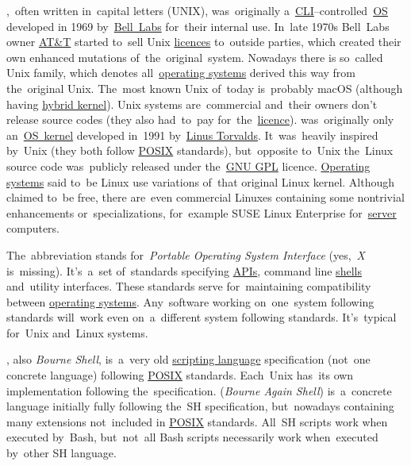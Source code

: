 \label{linux}

\label{unixlinux}
\begin{itemize}
    ,~often written in~capital letters (UNIX), was~originally a~\hyperref[shellcligui]{CLI}--controlled~\hyperref[os]{OS} developed in 1969 by~\href{https://en.wikipedia.org/wiki/Bell_Labs}{Bell~Labs} for~their internal use.
            In~late 1970s Bell~Labs owner \href{https://en.wikipedia.org/wiki/AT\%26T}{AT\&T} started to~sell Unix \hyperref[licencing]{licences} to~outside parties, which created their own enhanced mutations of~the~original~system.
            Nowadays there is so~called Unix family, which denotes all~\hyperref[os]{operating systems} derived this way from the~original Unix.
            The~most known Unix of~today is~probably macOS (although having \hyperref[hybridkernel]{hybrid kernel}).
            \warningnonl Unix systems are~commercial and~their owners don't release source codes (they also had~to~pay for~the~\hyperref[licencing]{licence}).
     was~originally only an~\hyperref[kernel]{OS~kernel} developed in~1991 by~\href{https://en.wikipedia.org/wiki/Linus_Torvalds}{Linus Torvalds}.
            It~was~heavily inspired by~Unix (they both follow \hyperref[posix]{POSIX} standards), but~opposite to~Unix the~Linux source code was~publicly released under the~\hyperref[gpl]{GNU GPL} licence.
            \hyperref[os]{Operating systems} said to~be Linux use variations of~that original Linux kernel.
            Although claimed to~be free, there are~even commercial Linuxes containing some nontrivial enhancements or~specializations, for~example SUSE Linux Enterprise for~\hyperref[server]{server} computers.
\end{itemize}

\label{posix}
The~abbreviation stands for~\textit{Portable Operating System Interface} (yes,~\textit{X} is~missing).
It's~a~set of~standards specifying \hyperref[api]{APIs}, command line \hyperref[shellcligui]{shells} and~utility interfaces.
These standards serve for~maintaining compatibility between \hyperref[os]{operating systems}.
Any~software working on~one~system following standards will~work even on~a~different system following standards.
It's~typical for~Unix and~Linux systems.
\newpage

\label{shbash}
\begin{itemize}
    , also \textit{Bourne Shell}, is~a~very old \hyperref[scriptinglanguages]{scripting language} specification (not~one concrete language) following \hyperref[posix]{POSIX} standards.
            Each~Unix has~its own implementation following the~specification.
     (\textit{Bourne Again Shell}) is~a~concrete language initially fully following the~SH specification, but~nowadays containing many extensions not~included in \hyperref[posix]{POSIX} standards.
            All~SH scripts work when executed by~Bash, but~not~all Bash scripts necessarily work when~executed by~other SH language.
\end{itemize}


